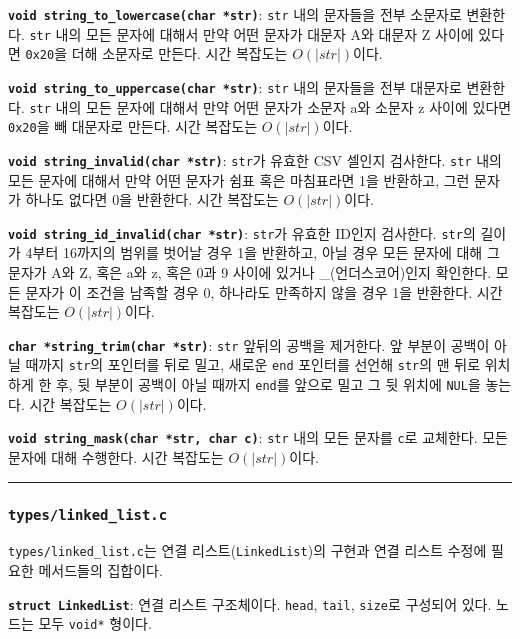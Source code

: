 \documentclass[runningheads]{llncs}
\begin{document}
\textbf{\texttt{void string_to_lowercase(char *str)}}: \texttt{str} 내의 문자들을 전부 소문자로 변환한다. \texttt{str} 내의 모든 문자에 대해서 만약 어떤 문자가 대문자 A와 대문자 Z 사이에 있다면 \texttt{0x20}을 더해 소문자로 만든다. 시간 복잡도는 $O(\left|str\right|)$이다.

\textbf{\texttt{void string_to_uppercase(char *str)}}: \texttt{str} 내의 문자들을 전부 대문자로 변환한다. \texttt{str} 내의 모든 문자에 대해서 만약 어떤 문자가 소문자 a와 소문자 z 사이에 있다면 \texttt{0x20}을 빼 대문자로 만든다. 시간 복잡도는 $O(\left|str\right|)$이다.

\textbf{\texttt{void string_invalid(char *str)}}: \texttt{str}가 유효한 CSV 셀인지 검사한다. \texttt{str} 내의 모든 문자에 대해서 만약 어떤 문자가 쉼표 혹은 마침표라면 1을 반환하고, 그런 문자가 하나도 없다면 0을 반환한다. 시간 복잡도는 $O(\left|str\right|)$이다.

\textbf{\texttt{void string_id_invalid(char *str)}}: \texttt{str}가 유효한 ID인지 검사한다. \texttt{str}의 길이가 4부터 16까지의 범위를 벗어날 경우 1을 반환하고, 아닐 경우 모든 문자에 대해 그 문자가 A와 Z, 혹은 a와 z, 혹은 0과 9 사이에 있거나 _(언더스코어)인지 확인한다. 모든 문자가 이 조건을 남족할 경우 0, 하나라도 만족하지 않을 경우 1을 반환한다. 시간 복잡도는 $O(\left|str\right|)$이다.

\textbf{\texttt{char *string_trim(char *str)}}: \texttt{str} 앞뒤의 공백을 제거한다. 앞 부분이 공백이 아닐 때까지 \texttt{str}의 포인터를 뒤로 밀고, 새로운 \texttt{end} 포인터를 선언해 \texttt{str}의 맨 뒤로 위치하게 한 후, 뒷 부분이 공백이 아닐 때까지 \texttt{end}를 앞으로 밀고 그 뒷 위치에 \texttt{NUL}을 놓는다. 시간 복잡도는 $O(\left|str\right|)$이다.

\textbf{\texttt{void string_mask(char *str, char c)}}: \texttt{str} 내의 모든 문자를 \texttt{c}로 교체한다. 모든 문자에 대해 수행한다. 시간 복잡도는 $O(\left|str\right|)$이다.

\noindent\rule{2cm}{0.4pt}

\subsubsection{\texttt{types/linked_list.c}}
\texttt{types/linked_list.c}는 연결 리스트(\texttt{LinkedList})\cite{linkedlist}의 구현과 연결 리스트 수정에 필요한 메서드들의 집합이다.

\textbf{\texttt{struct LinkedList}}: 연결 리스트 구조체이다. \texttt{head}, \texttt{tail}, \texttt{size}로 구성되어 있다. 노드는 모두 \texttt{void*} 형이다.
\end{document}
